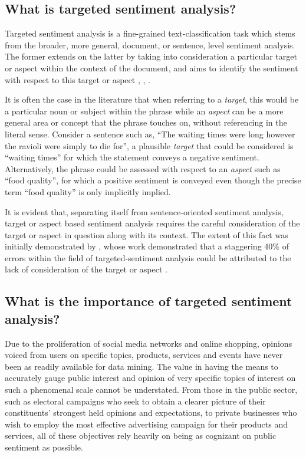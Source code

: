\documentclass[../../fyp.tex]{subfiles}
\begin{document}
\subsection{What is targeted sentiment analysis?}
Targeted sentiment analysis is a fine-grained text-classification task which stems from the broader, more general, document, or sentence, level sentiment analysis. The former extends on the latter by taking into consideration a particular target or aspect within the context of the document, and aims to identify the sentiment with respect to this target or aspect \cite{pang2008}, \cite{liu2012}, \cite{pontiki}.

It is often the case in the literature that when referring to a \textit{target}, this would be a particular noun or subject within the phrase while an \textit{aspect} can be a more general area or concept that the phrase touches on, without referencing in the literal sense. Consider a sentence such as, \enquote{The waiting times were long however the ravioli were simply to die for}, a plausible \textit{target} that could be considered is \enquote{waiting times} for which the statement conveys a negative sentiment. Alternatively, the phrase could be assessed with respect to an \textit{aspect} such as \enquote{food quality}, for which a positive sentiment is conveyed even though the precise term \enquote{food quality} is only implicitly implied.

It is evident that, separating itself from sentence-oriented sentiment analysis, target or aspect based sentiment analysis requires the careful consideration of the target or aspect in question along with its context. The extent of this fact was initially demonstrated by \cite{jiang2011}, whose work demonstrated that a staggering 40\% of errors within the field of targeted-sentiment analysis could be attributed to the lack of consideration of the target or aspect \cite{jiang2011}.

\subsection{What is the importance of targeted sentiment analysis?}
Due to the proliferation of social media networks and online shopping, opinions voiced from users on specific topics, products, services and events have never been as readily available for data mining. The value in having the means to accurately gauge public interest and opinion of very specific topics of interest on such a phenomenal scale cannot be understated. From those in the public sector, such as electoral campaigns who seek to obtain a clearer picture of their constituents' strongest held opinions and expectations, to private businesses who wish to employ the most effective advertising campaign for their products and services, all of these objectives rely heavily on being as cognizant on public sentiment as possible. \cite{tang2016}
\end{document}
